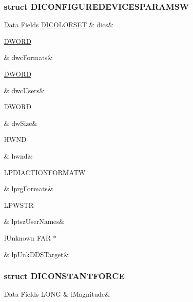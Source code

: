 \subsubsection{struct D\-I\-C\-O\-N\-F\-I\-G\-U\-R\-E\-D\-E\-V\-I\-C\-E\-S\-P\-A\-R\-A\-M\-S\-W}
\begin{DoxyFields}{Data Fields}
\hypertarget{a00003_a1877b79618926362653fbfec34a6321a}{\hyperlink{a00003_d3/d8b/a00059}{D\-I\-C\-O\-L\-O\-R\-S\-E\-T}}\label{a00003_a1877b79618926362653fbfec34a6321a}
&
dics&
\\
\hline

\hypertarget{a00003_ae3a71581f53b592af8910ac6a9f867f7}{\hyperlink{a00003_a50e15ae51c87ae06ab29c8148cb5f36c}{D\-W\-O\-R\-D}}\label{a00003_ae3a71581f53b592af8910ac6a9f867f7}
&
dwc\-Formats&
\\
\hline

\hypertarget{a00003_ade21eb3ea47100f8f2a53b9c9ed0a16e}{\hyperlink{a00003_a50e15ae51c87ae06ab29c8148cb5f36c}{D\-W\-O\-R\-D}}\label{a00003_ade21eb3ea47100f8f2a53b9c9ed0a16e}
&
dwc\-Users&
\\
\hline

\hypertarget{a00003_a669c5a85f5a9eb97e64ad880fadaaa2d}{\hyperlink{a00003_a50e15ae51c87ae06ab29c8148cb5f36c}{D\-W\-O\-R\-D}}\label{a00003_a669c5a85f5a9eb97e64ad880fadaaa2d}
&
dw\-Size&
\\
\hline

\hypertarget{a00003_aa72255e7356d612ad72bb45def01fcbb}{H\-W\-N\-D}\label{a00003_aa72255e7356d612ad72bb45def01fcbb}
&
hwnd&
\\
\hline

\hypertarget{a00003_a2e911f0ccc9fc27bad1a49a4891fdd5d}{L\-P\-D\-I\-A\-C\-T\-I\-O\-N\-F\-O\-R\-M\-A\-T\-W}\label{a00003_a2e911f0ccc9fc27bad1a49a4891fdd5d}
&
lprg\-Formats&
\\
\hline

\hypertarget{a00003_a5083f9ab0fdae83a94473ebb76593ca5}{L\-P\-W\-S\-T\-R}\label{a00003_a5083f9ab0fdae83a94473ebb76593ca5}
&
lptsz\-User\-Names&
\\
\hline

\hypertarget{a00003_a6e6e41b251e9d9f1871531c9d8c07e09}{I\-Unknown F\-A\-R $\ast$}\label{a00003_a6e6e41b251e9d9f1871531c9d8c07e09}
&
lp\-Unk\-D\-D\-S\-Target&
\\
\hline

\end{DoxyFields}
\label{d1/d6f/a00063}
\hypertarget{a00003_d1/d6f/a00063}{}
\subsubsection{struct D\-I\-C\-O\-N\-S\-T\-A\-N\-T\-F\-O\-R\-C\-E}
\begin{DoxyFields}{Data Fields}
\hypertarget{a00003_adf9440090100aaa93b6c66b8fb78e5b5}{L\-O\-N\-G}\label{a00003_adf9440090100aaa93b6c66b8fb78e5b5}
&
l\-Magnitude&
\\
\hline

\end{DoxyFields}
\label{df/d5f/a00064}
\hypertarget{a00003_df/d5f/a00064}{}
